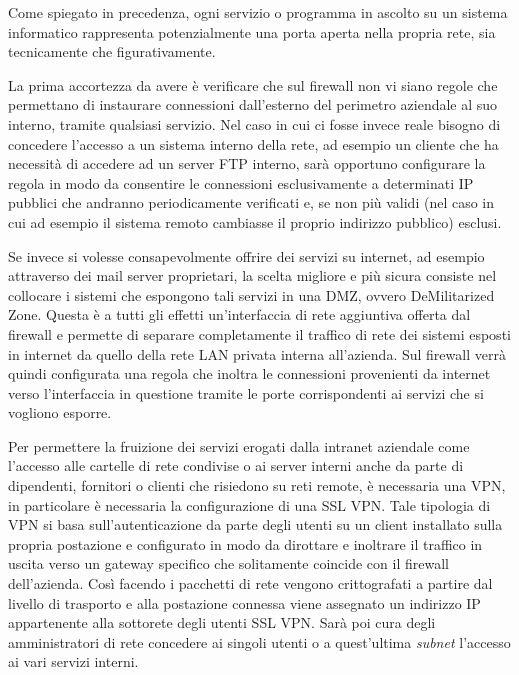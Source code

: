 \documentclass[target=bach,aauheader=]{thud}
\begin{document}
Come spiegato in precedenza, ogni servizio o programma in ascolto su un sistema informatico rappresenta potenzialmente una porta aperta nella propria rete, sia tecnicamente che figurativamente.

La prima accortezza da avere è verificare che sul firewall non vi siano regole che permettano di instaurare connessioni dall'esterno del perimetro aziendale al suo interno, tramite qualsiasi servizio. Nel caso in cui ci fosse invece reale bisogno di concedere l'accesso a un sistema interno della rete, ad esempio un cliente che ha necessità di accedere ad un server FTP interno, sarà opportuno configurare la regola in modo da consentire le connessioni esclusivamente a determinati IP pubblici che andranno periodicamente verificati e, se non più validi (nel caso in cui ad esempio il sistema remoto cambiasse il proprio indirizzo pubblico) esclusi.

Se invece si volesse consapevolmente offrire dei servizi su internet, ad esempio attraverso dei mail server proprietari, la scelta migliore e più sicura consiste nel collocare i sistemi che espongono tali servizi in una DMZ, ovvero DeMilitarized Zone. Questa è a tutti gli effetti un'interfaccia di rete aggiuntiva offerta dal firewall e permette di separare completamente il traffico di rete dei sistemi esposti in internet da quello della rete LAN privata interna all'azienda. Sul firewall verrà quindi configurata una regola che inoltra le connessioni provenienti da internet verso l'interfaccia in questione tramite le porte corrispondenti ai servizi che si vogliono esporre.

Per permettere la fruizione dei servizi erogati dalla intranet aziendale come l'accesso alle cartelle di rete condivise o ai server interni anche da parte di dipendenti, fornitori o clienti che risiedono su reti remote, è necessaria una VPN, in particolare è necessaria la configurazione di una SSL VPN. Tale tipologia di VPN si basa sull'autenticazione da parte degli utenti su un client installato sulla propria postazione e configurato in modo da dirottare e inoltrare il traffico in uscita verso un gateway specifico che solitamente coincide con il firewall dell'azienda. Così facendo i pacchetti di rete vengono crittografati a partire dal livello di trasporto e alla postazione connessa viene assegnato un indirizzo IP appartenente alla sottorete degli utenti SSL VPN. Sarà poi cura degli amministratori di rete concedere ai singoli utenti o a quest'ultima \textit{subnet} l'accesso ai vari servizi interni. 
\end{document}
